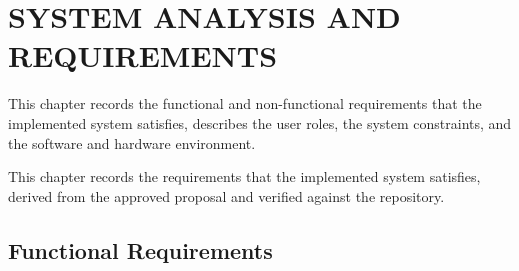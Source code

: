 \chapter{SYSTEM ANALYSIS AND REQUIREMENTS}
\thispagestyle{empty}

This chapter records the functional and non-functional requirements that the
implemented system satisfies, describes the user roles, the system
constraints, and the software and hardware environment.

\clearpage

This chapter records the requirements that the implemented system satisfies,
derived from the approved proposal and verified against the repository.

\section{Functional Requirements}

